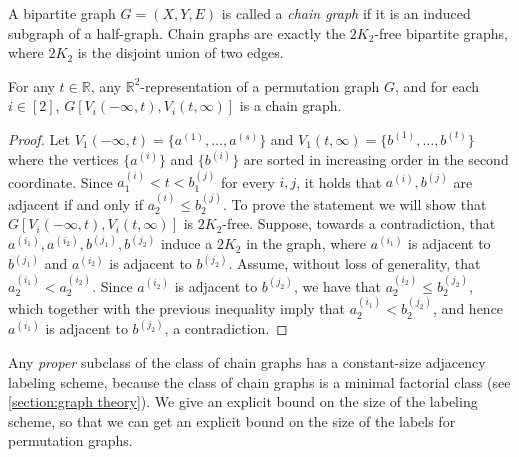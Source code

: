 \documentclass{theoretics}
\newcommand{\bR}{\ensuremath{\mathbb{R}}}
\begin{document}
\newcommand{\twH}{H^{\mathrm{tw}}}
A bipartite graph $G = (X,Y,E)$ is called a \emph{chain graph} if it is an induced subgraph of a half-graph.  Chain graphs are exactly the $2K_2$-free bipartite graphs,
where $2K_2$ is the disjoint union of two edges.

\begin{proposition}
	\label{prop:twinned half-graph}
	For any $t \in \bR$, any $\bR^2$-representation of a permutation graph $G$, and for each $i \in [2]$, $G[V_i(-\infty,t),V_i(t,\infty)]$ is a chain graph.
\end{proposition}
\begin{proof}
	Let $V_1(-\infty,t) = \{a^{(1)}, \dotsc, a^{(s)} \}$ and $V_1(t, \infty) = \{b^{(1)}, \dotsc,
	b^{(t)}\}$ where the vertices $\{a^{(i)}\}$ and $\{b^{(i)}\}$ are sorted in increasing order in the
	second coordinate. Since $a^{(i)}_1 < t < b^{(j)}_1$ for every $i,j$, it holds that
	$a^{(i)},b^{(j)}$ are adjacent if and only if $a^{(i)}_2 \leq b^{(j)}_2$. 
	To prove the statement we will show that $G[V_i(-\infty,t),V_i(t,\infty)]$ is $2K_2$-free.
	Suppose, towards a contradiction, that $a^{(i_1)}, a^{(i_2)}, b^{(j_1)}, b^{(j_2)}$ induce a $2K_2$ in the graph,
	where $a^{(i_1)}$ is adjacent to $b^{(j_1)}$ and $a^{(i_2)}$ is adjacent to $b^{(j_2)}$.
	Assume, without loss of generality, that $a_2^{(i_1)} < a_2^{(i_2)}$. Since $a^{(i_2)}$ is adjacent to $b^{(j_2)}$,
	we have that $a_2^{(i_2)} \leq b_2^{(j_2)}$, which together with the previous inequality imply that 
	$a_2^{(i_1)} < b_2^{(j_2)}$, and hence $a^{(i_1)}$ is adjacent to $b^{(j_2)}$, a contradiction.
\end{proof}

Any \emph{proper} subclass of the class of chain graphs has a constant-size adjacency labeling scheme, because
the class of chain graphs is a minimal factorial class (see \cref{section:graph theory}). We give an explicit bound on the size of the labeling
scheme, so that we can get an explicit bound on the size of the labels for permutation graphs.
\end{document}
